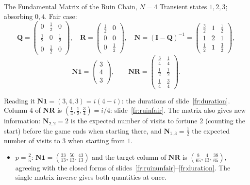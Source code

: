 \begin{frame}{The Fundamental Matrix of the Ruin Chain, $N=4$}
  \label{fr:fundruin}
  \small
  Transient states $1,2,3$; absorbing $0,4$. Fair case:
  \[
    \mathbf Q=\begin{pmatrix}0&\tfrac12&0\\ \tfrac12&0&\tfrac12\\ 0&\tfrac12&0\end{pmatrix},\quad
    \mathbf R=\begin{pmatrix}\tfrac12&0\\0&0\\0&\tfrac12\end{pmatrix},\quad
    \mathbf N=(\mathbf I-\mathbf Q)^{-1}=\begin{pmatrix}\tfrac32&1&\tfrac12\\1&2&1\\ \tfrac12&1&\tfrac32\end{pmatrix},
  \]
  \[
    \mathbf N\mathbf 1=\begin{pmatrix}3\\4\\3\end{pmatrix},\qquad
    \mathbf N\mathbf R=\begin{pmatrix}\tfrac34&\tfrac14\\ \tfrac12&\tfrac12\\ \tfrac14&\tfrac34\end{pmatrix}.
  \]
  \begin{exampleblock}{Reading it}
    $\mathbf N\mathbf 1=(3,4,3)=i(4-i)$: the durations of slide~\ref{fr:duration}. Column $4$ of $\mathbf N\mathbf R$ is $(\tfrac14,\tfrac12,\tfrac34)=i/4$: slide~\ref{fr:ruinfair}. The matrix also gives new information: $\mathbf N_{2,2}=2$ is the expected number of visits to fortune $2$ (counting the start) before the game ends when starting there, and $\mathbf N_{1,3}=\tfrac12$ the expected number of visits to $3$ when starting from $1$.
  \end{exampleblock}
  \begin{itemize}
    \item $p=\tfrac25$: $\mathbf N\mathbf 1=(\tfrac{33}{13},\tfrac{50}{13},\tfrac{43}{13})$ and the target column of $\mathbf N\mathbf R$ is $(\tfrac8{65},\tfrac4{13},\tfrac{38}{65})$, agreeing with the closed forms of slides~\ref{fr:ruinunfair}--\ref{fr:duration}. The single matrix inverse gives both quantities at once.
  \end{itemize}
\end{frame}


